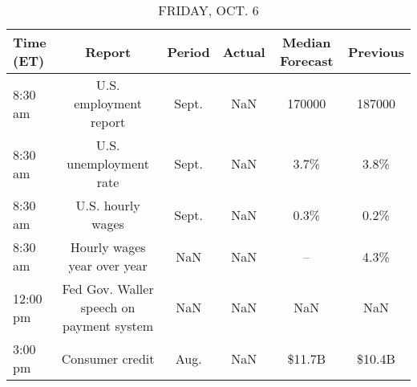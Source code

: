 \documentclass{article}%
\begin{document}
%


\begin{table}[htbp]%
\caption{FRIDAY, OCT. 6}%
\centering%
\begin{adjustbox}{width=1\textwidth}%
\begin{tabular}{lccccc}
\toprule
Time (ET) &                                   Report & Period & Actual & Median Forecast & Previous \\
\midrule
  8:30 am &                   U.S. employment report &  Sept. &    NaN &          170000 &   187000 \\
  8:30 am &                   U.S. unemployment rate &  Sept. &    NaN &            3.7\% &     3.8\% \\
  8:30 am &                        U.S. hourly wages &  Sept. &    NaN &            0.3\% &     0.2\% \\
  8:30 am &              Hourly wages year over year &    NaN &    NaN &              -- &     4.3\% \\
 12:00 pm & Fed Gov. Waller speech on payment system &    NaN &    NaN &             NaN &      NaN \\
  3:00 pm &                          Consumer credit &   Aug. &    NaN &          \$11.7B &   \$10.4B \\
\bottomrule
\end{tabular}
%
\end{adjustbox}%
\end{table}
\end{document}
